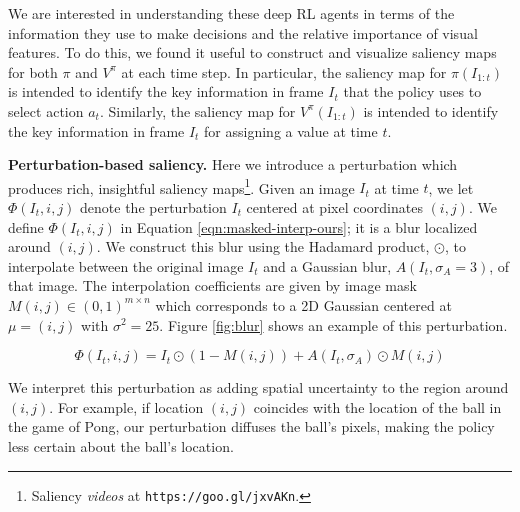 \documentclass{article}
\begin{document}
We are interested in understanding these deep RL agents in terms of the information they use to make decisions and the relative importance of visual features. To do this, we found it useful to construct and visualize saliency maps for both $\pi$ and $V^{\pi}$ at each time step. In particular, the saliency map for $\pi(I_{1:t})$ is intended to identify the key information in frame $I_t$ that the policy uses to select action $a_t$. Similarly, the saliency map for $V^{\pi}(I_{1:t})$ is intended to identify the key information in frame $I_t$ for assigning a value at time $t$. 



\textbf{Perturbation-based saliency.} Here we introduce a perturbation which produces rich, insightful saliency maps\footnote{Saliency \textit{videos} at \texttt{https://goo.gl/jxvAKn}.}. Given an image $I_t$ at time $t$, we let $\Phi(I_t,i,j)$ denote the perturbation $I_t$ centered at pixel coordinates $(i,j)$. We define $\Phi(I_t,i,j)$ in Equation \ref{eqn:masked-interp-ours}; it is a blur localized around $(i,j)$. We construct this blur using the Hadamard product, $\odot$, to interpolate between the original image $I_t$ and a Gaussian blur, $A(I_t, \sigma_A=3)$, of that image. The interpolation coefficients are given by image mask $M(i,j) \in (0,1)^{m\times n}$ which corresponds to a 2D Gaussian centered at $\mu=(i,j)$ with $\sigma^2=25$. Figure \ref{fig:blur} shows an example of this perturbation.

\begin{equation}
\Phi(I_t,i,j) = I_t \odot (1-M(i,j)) + A(I_t, \sigma_A) \odot M(i,j)
\label{eqn:masked-interp-ours}
\end{equation}

We interpret this perturbation as adding spatial uncertainty to the region around $(i,j)$. For example, if location $(i,j)$ coincides with the location of the ball in the game of Pong, our perturbation diffuses the ball's pixels, making the policy less certain about the ball's location. 
\end{document}

